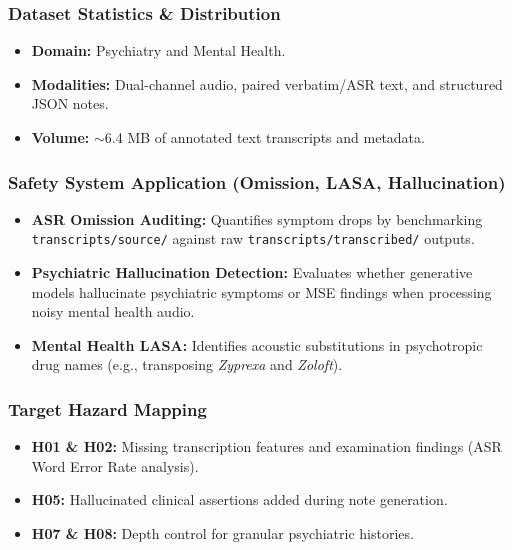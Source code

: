 \subsubsection*{Dataset Statistics \& Distribution}
\begin{itemize}
    \item \textbf{Domain:} Psychiatry and Mental Health.
    \item \textbf{Modalities:} Dual-channel audio, paired verbatim/ASR text, and structured JSON notes.
    \item \textbf{Volume:} $\sim$6.4 MB of annotated text transcripts and metadata.
\end{itemize}

\subsubsection*{Safety System Application (Omission, LASA, Hallucination)}
\begin{itemize}
    \item \textbf{ASR Omission Auditing:} Quantifies symptom drops by benchmarking \texttt{transcripts/source/} against raw \texttt{transcripts/transcribed/} outputs.
    \item \textbf{Psychiatric Hallucination Detection:} Evaluates whether generative models hallucinate psychiatric symptoms or MSE findings when processing noisy mental health audio.
    \item \textbf{Mental Health LASA:} Identifies acoustic substitutions in psychotropic drug names (e.g., transposing \textit{Zyprexa} and \textit{Zoloft}).
\end{itemize}

\subsubsection*{Target Hazard Mapping}
\begin{itemize}
    \item \textbf{H01 \& H02:} Missing transcription features and examination findings (ASR Word Error Rate analysis).
    \item \textbf{H05:} Hallucinated clinical assertions added during note generation.
    \item \textbf{H07 \& H08:} Depth control for granular psychiatric histories.
\end{itemize}

\clearpage

